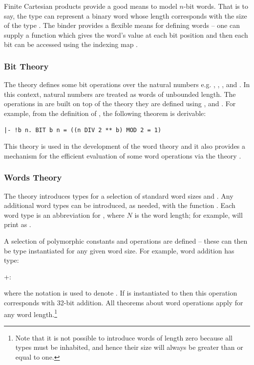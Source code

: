 {Finite Cartesian products provide a good means to model $n$-bit words.  That is 
to say, the type  can represent a binary word whose length 
corresponds with the size of the type .  The binder  
provides a flexible means for defining words -- one can supply a function 
 which gives the word's value at each bit position and 
then each bit can be accessed using the indexing map \holtxt{\%\%}.

\subsubsection{Bit Theory}

The theory  defines some bit operations over the natural numbers 
e.g. , , ,  and 
. In this context, natural numbers are treated as words of 
unbounded length.  The operations in  are built on top of the 
theory  \ie{} they are defined using , 
 and .  For example, from the definition of 
, the following theorem is derivable:
\begin{hol}
\begin{verbatim}
|- !b n. BIT b n = ((n DIV 2 ** b) MOD 2 = 1)
\end{verbatim}
\end{hol}

This theory is used in the development of the word theory and it also provides 
a mechanism for the efficient evaluation of some word operations via the theory 
.

\subsubsection{Words Theory}

The theory  introduces types for a selection of standard word 
sizes \eg{}  and .  Any additional word types can be 
introduced, as needed, with the function .  Each word 
type is an abbreviation for , where $N$ is the word length; for 
example,  will print as .

A selection of polymorphic constants and operations are defined -- these can 
then be type instantiated for any given word size.  For example, word addition 
has type:
\begin{hol}
+:\worda\rarr\worda\rarr\worda
\end{hol}
where the notation \worda is used to denote . If  is 
instantiated to  then this operation corresponds with 32-bit addition.  
All theorems about word operations apply for any word length.\footnote{Note 
that it is not possible to introduce words of length zero because all types 
must be inhabited, and hence their size will always be greater than or equal to 
one.}

}
